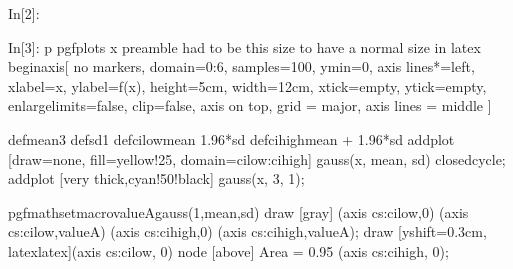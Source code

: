 \documentclass[float=false,crop=false]{standalone}
\begin{document}
\begin{InVerbatim}[commandchars=\\\{\},fontsize=\scriptsize]
{\color{incolor}In[{\color{incolor}2}]:}   
\end{InVerbatim}
    
\begin{InVerbatim}[commandchars=\\\{\},fontsize=\scriptsize]
{\color{incolor}In[{\color{incolor}3}]:}  \PYZhy{}p pgfplots \PYZhy{}x \PYZdl{}preamble
        \PYZpc{} had to be this size to have a normal size in latex
            \PYZbs{}begin\PYZob{}axis\PYZcb{}[
                no markers,
                domain=0:6,
                samples=100,
                ymin=0,
                axis lines*=left,
                xlabel=\PYZdl{}x\PYZdl{},
                ylabel=\PYZdl{}f(x)\PYZdl{},
                height=5cm,
                width=12cm,
                xtick=\PYZbs{}empty,
                ytick=\PYZbs{}empty,
                enlargelimits=false,
                clip=false,
                axis on top,
                grid = major,
                axis lines = middle
              ]
        
            \PYZbs{}def\PYZbs{}mean\PYZob{}3\PYZcb{}
            \PYZbs{}def\PYZbs{}sd\PYZob{}1\PYZcb{}
            \PYZbs{}def\PYZbs{}cilow\PYZob{}\PYZbs{}mean \PYZhy{} 1.96*\PYZbs{}sd\PYZcb{}
            \PYZbs{}def\PYZbs{}cihigh\PYZob{}\PYZbs{}mean + 1.96*\PYZbs{}sd\PYZcb{}
            \PYZbs{}addplot [draw=none, fill=yellow!25, domain=\PYZbs{}cilow:\PYZbs{}cihigh] \PYZob{}gauss(x, \PYZbs{}mean, \PYZbs{}sd)\PYZcb{}
        \PYZbs{}closedcycle;
            \PYZbs{}addplot [very thick,cyan!50!black] \PYZob{}gauss(x, 3, 1)\PYZcb{};
        
            \PYZbs{}pgfmathsetmacro\PYZbs{}valueA\PYZob{}gauss(1,\PYZbs{}mean,\PYZbs{}sd)\PYZcb{}
            \PYZbs{}draw [gray] (axis cs:\PYZbs{}cilow,0) \PYZhy{}\PYZhy{} (axis cs:\PYZbs{}cilow,\PYZbs{}valueA) (axis cs:\PYZbs{}cihigh,0) \PYZhy{}\PYZhy{}
        (axis cs:\PYZbs{}cihigh,\PYZbs{}valueA);
            \PYZbs{}draw [yshift=0.3cm, latex\PYZhy{}latex](axis cs:\PYZbs{}cilow, 0) \PYZhy{}\PYZhy{} node [above] \PYZob{}Area = \PYZdl{}0.95\PYZdl{}\PYZcb{}
        (axis cs:\PYZbs{}cihigh, 0);
        

\end{InVerbatim}
\end{document}
